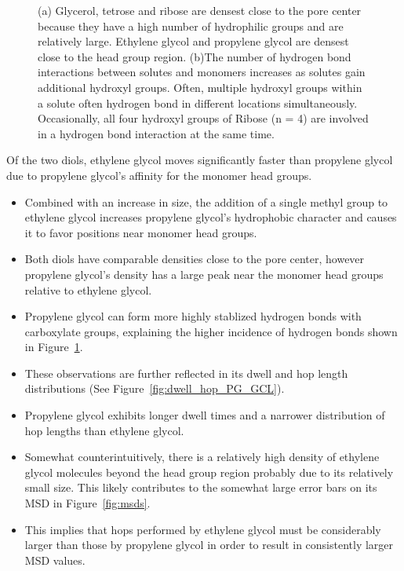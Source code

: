 \documentclass{article}
\begin{document}
\begin{figure}[!htb]
  \caption{(a) Glycerol, tetrose and ribose are densest close to the pore center because
  they have a high number of hydrophilic groups and are relatively large. Ethylene glycol
  and propylene glycol are densest close to the head group region. (b)The number of 
  hydrogen bond interactions between solutes and monomers increases as solutes gain additional
  hydroxyl groups. Often, multiple hydroxyl groups within a solute often hydrogen bond in
  different locations simultaneously. Occasionally, all four hydroxyl groups
  of Ribose (n = 4) are involved in a hydrogen bond interaction at the same time.}\label{fig:multi_hbonds}
  \end{figure}
  
  Of the two diols, ethylene glycol moves significantly faster than propylene glycol
  due to propylene glycol's affinity for the monomer head groups.  
  \begin{itemize}
    \item Combined with an increase in size, the addition of a single methyl group to ethylene glycol
    increases propylene glycol's hydrophobic character and causes it to favor positions
    near monomer head groups.
    \item Both diols have comparable densities close to the pore center, however propylene glycol's
    density has a large peak near the monomer head groups relative to ethylene glycol.
    \item Propylene glycol can form more highly stablized hydrogen bonds with carboxylate groups,
    explaining the higher incidence of hydrogen bonds shown in Figure~\ref{fig:multi_hbonds}.
    \item These observations are further reflected in its dwell and hop length distributions
    (See Figure~\ref{fig:dwell_hop_PG_GCL}).
    \item Propylene glycol exhibits longer dwell times and a narrower distribution of 
    hop lengths than ethylene glycol. 
    \item Somewhat counterintuitively, there is a relatively high density of ethylene
    glycol molecules beyond the head group region probably due to its relatively small size.
    This likely contributes to the somewhat large error bars on its MSD in Figure~\ref{fig:msds}. 
    \item This implies that hops performed by ethylene glycol must be considerably larger
    than those by propylene glycol in order to result in consistently larger MSD values.
  \end{itemize}
  
\end{document}
